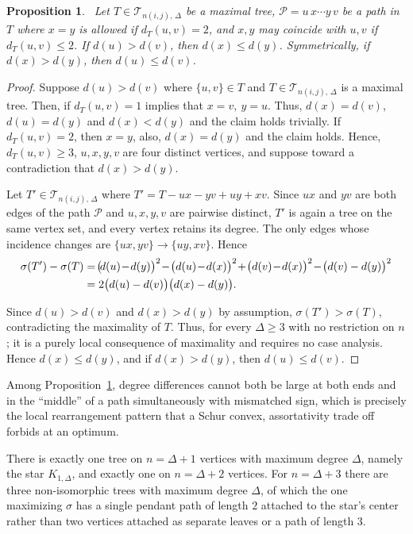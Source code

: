 \documentclass[12pt]{amsart}
\newtheorem{proposition}[theorem]{Proposition}
\newcommand{\TT}{\mathcal{T}}
\begin{document}
\begin{proposition}~\label{prop001pathmonotonicity}
Let $T\in \TT_{n(i,j),\,\Delta}$ be a maximal tree,
$\mathcal P=u\,x\cdots y\,v$ be a path in $T$ where $x=y$ is allowed if
$d_T(u,v)=2$, and $x,y$ may coincide with $u,v$ if $d_T(u,v)\leqslant 2$. If
$d(u)>d(v)$, then $d(x)\leqslant d(y)$. Symmetrically, if $d(x)>d(y)$, then
$d(u)\leqslant d(v)$.
\end{proposition}
\begin{proof}
Suppose $d(u)>d(v)$ where $\{u,v\}\in T$ and $T\in \TT_{n(i,j),\,\Delta}$ is a maximal tree. Then, if $d_T(u,v)=1$ implies that $x=v,\ y=u$. Thus, $d(x)=d(v)$, $d(u)=d(y)$ and $d(x)<d(y)$ and the claim
holds trivially. If $d_T(u,v)=2$, then $x=y$, also, $d(x)=d(y)$ and the claim
holds. Hence, $d_T(u,v)\geqslant 3$, $u,x,y,v$ are four distinct
vertices, and suppose toward a contradiction that $d(x)>d(y)$.

Let $T'\in \TT_{n(i,j),\,\Delta}$ where $T'=T-ux-yv+uy+xv$. Since $ux$ and $yv$ are both edges of the path $\mathcal P$ and $u,x,y,v$ are pairwise distinct, $T'$ is again a tree on the same vertex set, and every vertex retains its degree. The only edges whose
incidence changes are $\{ux,yv\}\to\{uy,xv\}$. Hence
\begin{align*}
\sigma(T')-\sigma(T)&=\!\big(\!d(u)\!-\!d(y)\big)^2\!-\!\big(d(u)\!-\!d(x)\big)^2\!+\! \big(d(v)\!-\!d(x)\big)^2\!-\! \big(d(v)-d(y)\big)^2 \notag\\
&= 2\big(d(u)-d(v)\big)\big(d(x)-d(y)\big).
\end{align*}
 
Since $d(u)>d(v)$ and $d(x)>d(y)$ by assumption, $\sigma(T')>\sigma(T)$,
contradicting the maximality of $T$. Thus, for every $\Delta\ge 3$  with no restriction on $n$; it is a purely local consequence of maximality and requires no case analysis.  Hence $d(x)\leqslant d(y)$, and if $d(x)>d(y)$, then
$d(u)\leqslant d(v)$.
\end{proof}

Among Proposition~\ref{prop001pathmonotonicity}, degree differences cannot both be large at both ends
and in the ``middle'' of a path simultaneously with mismatched sign, which is
precisely the local rearrangement pattern that a Schur convex, assortativity
trade off forbids at an optimum.




There is exactly one tree on $n=\Delta+1$ vertices with maximum degree
$\Delta$, namely the star $K_{1,\Delta}$, and exactly one on $n=\Delta+2$
vertices. For $n=\Delta+3$ there are three
non-isomorphic trees with maximum degree $\Delta$, of which the one
maximizing $\sigma$ has a single pendant path of length $2$ attached to the
star's center rather than two vertices attached as separate leaves or a path
of length $3$.
\end{document}

